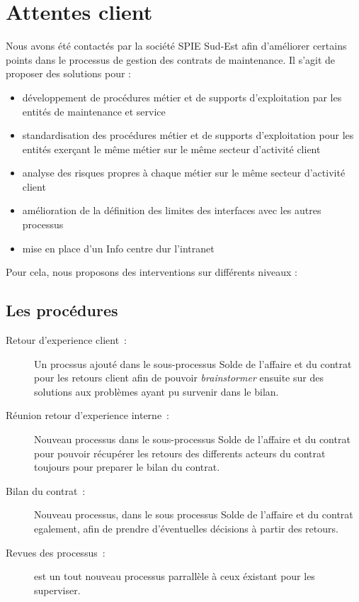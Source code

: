 \chapter{Attentes client}

	Nous avons été contactés par la société SPIE Sud-Est afin d'améliorer certains points dans le processus de gestion des contrats de maintenance. Il s'agit de proposer des solutions pour :

    \begin{itemize}
        \item développement de procédures métier et de supports d'exploitation par les entités de maintenance et service
        \item standardisation des procédures métier et de supports d'exploitation pour les entités exerçant le même métier sur le même secteur d'activité client
        \item analyse des risques propres à chaque métier sur le même secteur d'activité client
        \item amélioration de la définition des limites des interfaces avec les autres processus
        \item mise en place d'un Info centre dur l'intranet
    \end{itemize}

    Pour cela, nous proposons des interventions sur différents niveaux :


\section{Les procédures}

\begin{description}
    \item[Retour d'experience client~:] Un procssus ajouté dans le sous-processus Solde de l'affaire et du contrat pour les retours client afin de pouvoir \textit{brainstormer} ensuite sur des solutions aux problèmes ayant
    pu survenir dans le bilan.
    \item[R\'eunion retour d'experience interne~:] Nouveau processus dans le sous-processus Solde de l'affaire et du contrat pour pouvoir r\'ecup\'erer les retours des differents acteurs du contrat toujours pour preparer
    le bilan du contrat.
    \item[Bilan du contrat~:] Nouveau processus, dans le sous processus Solde de l'affaire et du contrat egalement, afin de prendre d'éventuelles d\'ecisions \`a partir des retours.
    \item[Revues des processus~:] est un tout nouveau processus parrall\`ele \`a ceux \'existant pour les superviser.
\end{description}



